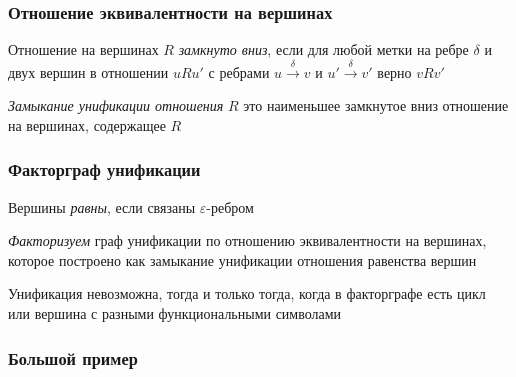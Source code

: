 \documentclass{beamer}
\begin{document}
\begin{frame}[fragile]
  \frametitle{Отношение эквивалентности на вершинах}
Отношение на вершинах $R$ \textit{замкнуто вниз}, если для любой метки на ребре $\delta$ и двух вершин в отношении $uRu'$ с ребрами $u \xrightarrow{\delta} v$ и $u' \xrightarrow{\delta} v'$ верно $vRv'$

\begin{center}
\end{center}

\bigskip

\textit{Замыкание унификации отношения} $R$ это наименьшее замкнутое вниз отношение на вершинах, содержащее $R$
\end{frame}

\begin{frame}[fragile]
  \frametitle{Факторграф унификации}
Вершины \textit{равны}, если связаны $\varepsilon$-ребром

\bigskip

\textit{Факторизуем} граф унификации по отношению эквивалентности на вершинах, которое построено как замыкание унификации отношения равенства вершин

\pause

\begin{center}
  
\end{center}

Унификация невозможна, тогда и только тогда, когда в факторграфе есть цикл или вершина с разными функциональными символами
\end{frame}


\begin{frame}[fragile]
  \frametitle{Большой пример}

  \begin{columns}
    \begin{column}{0.3\textwidth}
      
      \pause
    \end{column}
    \begin{column}{0.7\textwidth}
      \begin{center}
        
      \end{center}
    \end{column}
    \end{columns}

\end{frame}
\end{document}
